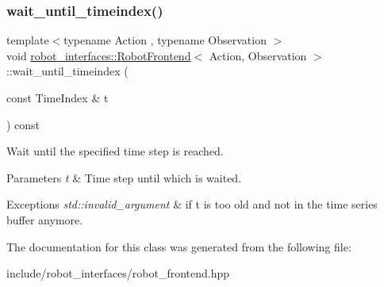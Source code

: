 \subsubsection{\texorpdfstring{wait\+\_\+until\+\_\+timeindex()}{wait\_until\_timeindex()}}
{\footnotesize\ttfamily template$<$typename Action , typename Observation $>$ \\
void \hyperlink{classrobot__interfaces_1_1RobotFrontend}{robot\+\_\+interfaces\+::\+Robot\+Frontend}$<$ Action, Observation $>$\+::wait\+\_\+until\+\_\+timeindex (\begin{DoxyParamCaption}\item[{const Time\+Index \&}]{t }\end{DoxyParamCaption}) const\hspace{0.3cm}{\ttfamily [inline]}}



Wait until the specified time step is reached. 


\begin{DoxyParams}{Parameters}
{\em t} & Time step until which is waited. \\
\hline
\end{DoxyParams}

\begin{DoxyExceptions}{Exceptions}
{\em std\+::invalid\+\_\+argument} & if t is too old and not in the time series buffer anymore. \\
\hline
\end{DoxyExceptions}


The documentation for this class was generated from the following file\+:\begin{DoxyCompactItemize}
\item 
include/robot\+\_\+interfaces/robot\+\_\+frontend.\+hpp\end{DoxyCompactItemize}
